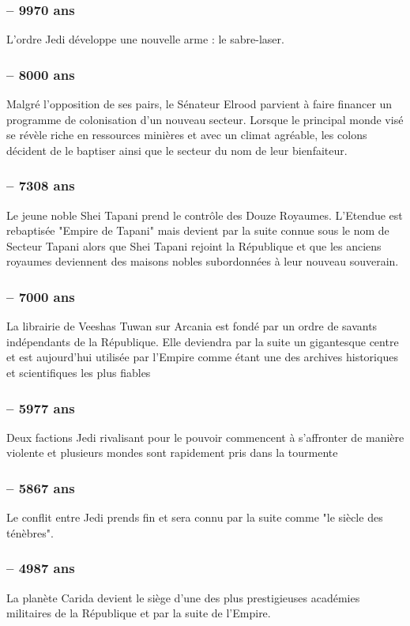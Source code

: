 \documentclass[twoside]{article}
\begin{document}
\subsubsection*{-- 9970 ans}
L'ordre Jedi développe une nouvelle arme : le sabre-laser. 
\subsubsection*{-- 8000 ans}
Malgré l'opposition de ses pairs, le Sénateur Elrood parvient à faire financer un programme de colonisation d'un nouveau secteur. Lorsque le principal monde visé se révèle riche en ressources minières et avec un climat agréable, les colons décident de le baptiser ainsi que le secteur du nom de leur bienfaiteur. 
\subsubsection*{-- 7308 ans}
Le jeune noble Shei Tapani prend le contrôle des Douze Royaumes. L'Etendue est rebaptisée "Empire de Tapani" mais devient par la suite connue sous le nom de Secteur Tapani alors que Shei Tapani rejoint la République et que les anciens royaumes deviennent des maisons nobles subordonnées à leur nouveau souverain. 
\subsubsection*{-- 7000 ans}
La librairie de Veeshas Tuwan sur Arcania est fondé par un ordre de savants indépendants de la République. Elle deviendra par la suite un gigantesque centre et est aujourd'hui utilisée par l'Empire comme étant une des archives historiques et scientifiques les plus fiables 
\subsubsection*{-- 5977 ans}
Deux factions Jedi rivalisant pour le pouvoir commencent à s'affronter de manière violente et plusieurs mondes sont rapidement pris dans la tourmente 
\subsubsection*{-- 5867 ans}
Le conflit entre Jedi prends fin et sera connu par la suite comme "le siècle des ténèbres". 
\subsubsection*{-- 4987 ans}
La planète Carida devient le siège d'une des plus prestigieuses académies militaires de la République et par la suite de l'Empire.  
\end{document}
